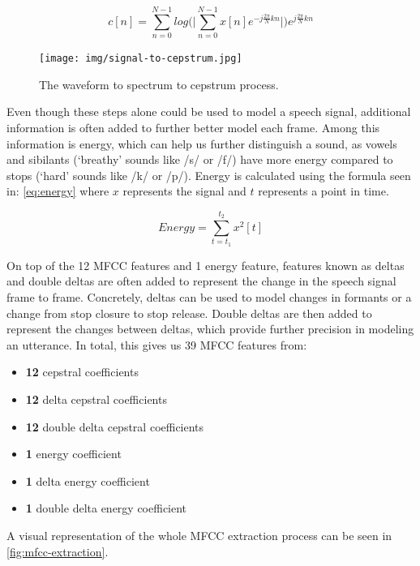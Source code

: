 \documentclass
[
    a4paper,
    twoside,
    12pt,
]
{report}
\begin{document}
\begin{equation}
\label{eq:cepstrum}
c[n] = \sum_{n=0}^{N-1}log\bigg(\bigg|\sum_{n=0}^{N-1}x[n]e^{{-j\frac{2\pi}{N}kn}}\bigg|\bigg)e^{j\frac{2\pi}{N}kn}
\end{equation}

\begin{figure}[]
\centering
\texttt{[image: img/signal-to-cepstrum.jpg]}
\caption{The waveform to spectrum to cepstrum process.}
\label{fig:signal-to-cepstrum}
\end{figure}

Even though these steps alone could be used to model a speech signal,
additional information is often added to further better model each
frame. Among this information is energy, which can help us further
distinguish a sound, as vowels and sibilants (`breathy' sounds like /s/
or /f/) have more energy compared to stops (`hard' sounds like /k/ or
/p/). Energy is calculated using the formula seen in:
\autoref{eq:energy} where \(x\) represents the signal and \(t\)
represents a point in time.

\begin{equation}
\label{eq:energy}
Energy = \sum_{t=t_1}^{t_2}x^2[t]
\end{equation}

On top of the 12 MFCC features and 1 energy feature, features known as
deltas and double deltas are often added to represent the change in the
speech signal frame to frame. Concretely, deltas can be used to model
changes in formants or a change from stop closure to stop release.
Double deltas are then added to represent the changes between deltas,
which provide further precision in modeling an utterance. In total, this
gives us 39 MFCC features from:

\begin{itemize}
   \setlength\itemsep{-1em}
   \item{\textbf{12} cepstral coefficients}
   \item{\textbf{12} delta cepstral coefficients}
   \item{\textbf{12} double delta cepstral coefficients}
   \item{\textbf{1} energy coefficient}
   \item{\textbf{1} delta energy coefficient}
   \item{\textbf{1} double delta energy coefficient}
\end{itemize}

A visual representation of the whole MFCC extraction process can be seen
in \autoref{fig:mfcc-extraction}.
\end{document}
